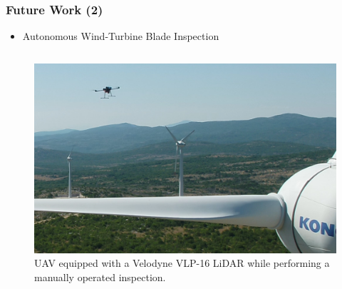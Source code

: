 \begin{frame}
	\frametitle{Future Work (2)}
	\begin{itemize}
		\item Autonomous Wind-Turbine Blade Inspection
	\end{itemize}
	
	\begin{columns}
	
		\begin{column}{0.5\textwidth}\centering
			\begin{figure}[H]
				\centering
				\includegraphics[width=\columnwidth]{figures/drone_flight3_1.png}
				\caption{UAV equipped with a Velodyne VLP-16 LiDAR while performing a manually operated inspection.}
			\end{figure}
		\end{column}
	

\end{columns}
\end{frame}
